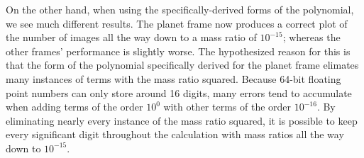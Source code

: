 \documentclass{article}
\begin{document}
On the other hand, when using the specifically-derived forms of the
polynomial, we see much different results. The planet frame now produces
a correct plot of the number of images all the way down to a mass ratio of
$10^{-15}$; whereas the other frames' performance is slightly worse. The
hypothesized reason for this is that the form of the polynomial specifically
derived for the planet frame elimates many instances of terms with the
mass ratio squared. Because 64-bit floating point numbers can only store
around 16 digits, many errors tend to accumulate when adding terms of the
order $10^{0}$ with other terms of the order $10^{-16}$. By eliminating
nearly every instance of the mass ratio squared, it is possible to keep
every significant digit throughout the calculation with mass ratios all
the way down to $10^{-15}$.
\end{document}
